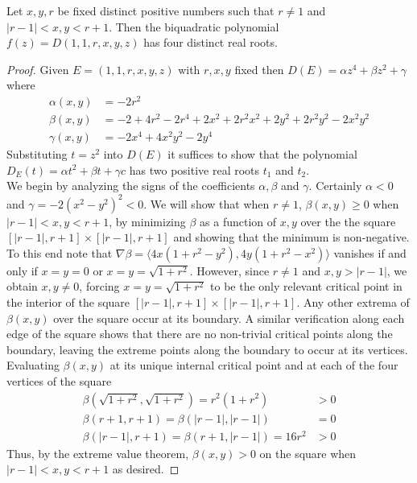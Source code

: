 \documentclass[10pt,a4paper]{amsart}
\begin{document}
\begin{Proposition}\label{prop:cayleymengerprop}
   Let $x,y,r$ be fixed distinct positive numbers such that $r \neq 1$ and $|r-1| < x,y < r+1$.
   Then the biquadratic polynomial $f(z) = D(1,1,r,x,y,z)$  has four distinct real roots.
\end{Proposition}

\begin{proof}
   Given $E = (1,1,r,x,y,z)$ with $r,x,y$  fixed then $D(E) = \alpha z^4 + \beta z^2 + \gamma$
    where
   \begin{equation*}
       \begin{split}
           \alpha(x,y) &= -2r^2\\
           \beta(x,y) &= -2+4r^2-2r^4+2x^2+2r^2x^2+2y^2+2r^2y^2-2x^2y^2\\
           \gamma(x,y) &= -2x^4 + 4x^2y^2 - 2y^4
       \end{split}
   \end{equation*}
   Substituting $t=z^2$ into $D(E)$ it suffices to show that the polynomial  $D_E(t) = \alpha t^2+\beta t+\gamma c$  has two positive real roots $t_1$ and $t_2$. \\

    We begin by analyzing the signs of the coefficients $\alpha,\beta$ and $\gamma$. Certainly $\alpha < 0$ and $\gamma = -2(x^2-y^2)^2 < 0$. 
    We will show that when $r \neq 1$, $\beta (x,y) \geq 0$ when $|r-1| < x,y < r+1$, by minimizing $\beta$ as a function of $x, y$ over the
    the square $[|r-1|,r+1] \times [|r-1|, r+1]$ and showing that the minimum is non-negative. To this end note that 
    $\nabla \beta = \langle 4x(1+r^2-y^2), 4y(1+r^2-x^2)\rangle$ vanishes if and only if $x=y=0$ or $x=y=\sqrt{1+r^2}$. However, since $r \neq 1$ and $x,y > |r-1|$, we obtain $x,y\neq 0$, forcing $x=y=\sqrt{1+r^2}$ to be the only relevant critical point in the interior of 
    the square $[|r-1|, r+1] \times [|r-1|, r+1]$. Any other extrema of $\beta(x,y)$ over the square  occur at its boundary. A similar verification along each edge of the square shows that there are no non-trivial critical points along the boundary, leaving the extreme points along the boundary to occur at its vertices. Evaluating $\beta(x,y)$ at its unique internal critical point and at each of the four vertices of the square
    \begin{equation*}
        \begin{split}
            \beta(\sqrt{1+r^2}, \sqrt{1+r^2}) = r^2(1+r^2) &> 0\\
            \beta(r+1,r+1) = \beta(|r-1|,|r-1|) &= 0\\
            \beta(|r-1|,r+1) = \beta(r+1,|r-1|) = 16r^2 &> 0
        \end{split}
    \end{equation*}
    Thus, by the extreme value theorem, $\beta(x,y) >0$ on the square when $|r-1| < x,y < r+1$ as desired. 
    


\end{proof}
\end{document}
